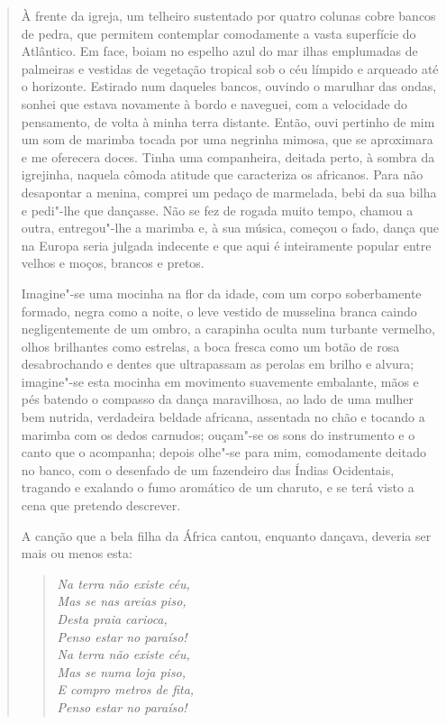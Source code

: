 \begin{quote}
À frente da igreja, um telheiro sustentado por quatro colunas cobre
bancos de pedra, que permitem contemplar comodamente a vasta superfície
do Atlântico. Em face, boiam no espelho azul do mar ilhas emplumadas de
palmeiras e vestidas de vegetação tropical sob o céu límpido e arqueado
até o horizonte. Estirado num daqueles bancos, ouvindo o marulhar das
ondas, sonhei que estava novamente à bordo e naveguei, com a velocidade
do pensamento, de volta à minha terra distante. Então, ouvi pertinho de
mim um som de marimba tocada por uma negrinha mimosa, que se aproximara
e me oferecera doces. Tinha uma companheira, deitada perto, à sombra da
igrejinha, naquela cômoda atitude que caracteriza os africanos. Para não
desapontar a menina, comprei um pedaço de marmelada, bebi da sua bilha e
pedi"-lhe que dançasse. Não se fez de rogada muito tempo, chamou a outra,
entregou"-lhe a marimba e, à sua música, começou o fado, dança que na
Europa seria julgada indecente e que aqui é inteiramente popular entre
velhos e moços, brancos e pretos.

Imagine"-se uma mocinha na flor da idade, com um corpo soberbamente
formado, negra como a noite, o leve vestido de musselina branca caindo
negligentemente de um ombro, a carapinha oculta num turbante vermelho,
olhos brilhantes como estrelas, a boca fresca como um botão de rosa
desabrochando e dentes que ultrapassam as perolas em brilho e alvura;
imagine"-se esta mocinha em movimento suavemente embalante, mãos e pés
batendo o compasso da dança maravilhosa, ao lado de uma mulher bem
nutrida, verdadeira beldade africana, assentada no chão e tocando a
marimba com os dedos carnudos; ouçam"-se os sons do instrumento e o canto
que o acompanha; depois olhe"-se para mim, comodamente deitado no banco,
com o desenfado de um fazendeiro das Índias Ocidentais, tragando e
exalando o fumo aromático de um charuto, e se terá visto a cena que
pretendo descrever.

A canção que a bela filha da África cantou, enquanto dançava, deveria
ser mais ou menos esta:

\begin{verse}
\emph{Na terra não existe céu,\\
Mas se nas areias piso,\\
Desta praia carioca,\\
Penso estar no paraíso!\\[5pt]
Na terra não existe céu,\\
Mas se numa loja piso,\\
E compro metros de fita,\\
Penso estar no paraíso!}
\end{verse}
\end{quote}

